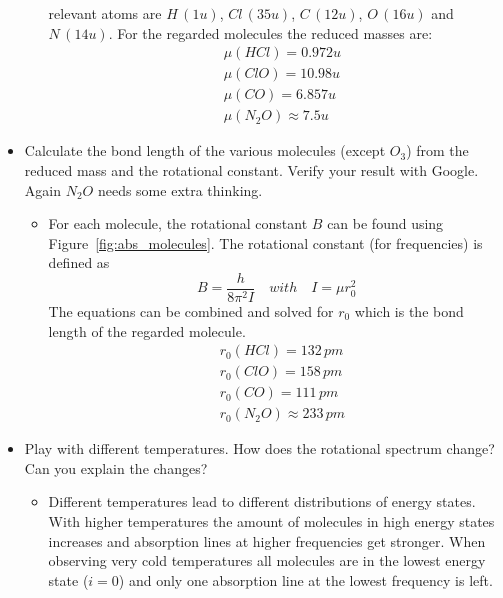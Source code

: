 \documentclass[paper=a4, fontsize=11pt]{scrartcl}
\begin{document}
\begin{itemize}
\begin{itemize}
            relevant atoms are $H\,(1u)$, $Cl\,(35u)$, $C\,(12u)$, $O\,(16u)$
            and $N\,(14u)$. For the regarded molecules the reduced masses are:
              \begin{align*}
                &\mu(HCl) = 0.972u \\
                &\mu(ClO) = 10.98u \\
                &\mu(CO) = 6.857u \\
                &\mu(N_2O) \approx 7.5u
              \end{align*}
        \end{itemize}
    \item Calculate the bond length of the various molecules (except $O_3$) from
        the reduced mass and the rotational constant. Verify your result with
        Google. Again $N_2O$ needs some extra thinking.
        \begin{itemize}
          \item For each molecule, the rotational constant $B$ can be found
            using Figure~\ref{fig:abs_molecules}.  The rotational constant
            (for frequencies) is defined as
            \begin{equation*}
              B = \frac{h}{8 \pi^2 I} \quad with \quad I = \mu r_0^2
            \end{equation*}
            The equations can be combined and solved for $r_0$ which is the
            bond length of the regarded molecule.
            \begin{align*}
               &r_0(HCl) = 132\,pm \\
               &r_0(ClO) = 158\,pm \\
               &r_0(CO) = 111\,pm \\
               &r_0(N_2O) \approx 233\,pm
            \end{align*}
        \end{itemize}
    \item Play with different temperatures. How does the rotational spectrum
        change? Can you explain the changes?
        \begin{itemize}
          \item Different temperatures lead to different distributions of
            energy states. With higher temperatures the amount of molecules
            in high energy states increases and absorption lines at higher
            frequencies get stronger. When observing very cold temperatures
            all molecules are in the lowest energy state ($i = 0$) and only
            one absorption line at the lowest frequency is left.
        \end{itemize}
\end{itemize}
\end{document}
